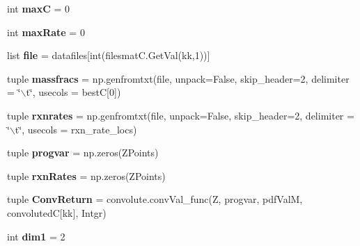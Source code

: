 \begin{DoxyCompactItemize}
\item 
\hypertarget{namespacechemtable__io_a645cd8efb888bfb4dbe872f6c047ee6d}{
int {\bfseries maxC} = 0}
\label{dc/dad/namespacechemtable__io_a645cd8efb888bfb4dbe872f6c047ee6d}

\item 
\hypertarget{namespacechemtable__io_ab840bd591060c54471e90a07a84837d1}{
int {\bfseries maxRate} = 0}
\label{dc/dad/namespacechemtable__io_ab840bd591060c54471e90a07a84837d1}

\item 
\hypertarget{namespacechemtable__io_ad1acbc31dd4224d8effffbc960625b2e}{
list {\bfseries file} = datafiles\mbox{[}int(filesmatC.GetVal(kk,1))\mbox{]}}
\label{dc/dad/namespacechemtable__io_ad1acbc31dd4224d8effffbc960625b2e}

\item 
\hypertarget{namespacechemtable__io_a1b6f65d372114ed7b5dae759fd83bc8b}{
tuple {\bfseries massfracs} = np.genfromtxt(file, unpack=False, skip\_\-header=2, delimiter = \char`\"{}$\backslash$t\char`\"{}, usecols = bestC\mbox{[}0\mbox{]})}
\label{dc/dad/namespacechemtable__io_a1b6f65d372114ed7b5dae759fd83bc8b}

\item 
\hypertarget{namespacechemtable__io_ac78dad13332ec190a05700765ceb3edc}{
tuple {\bfseries rxnrates} = np.genfromtxt(file, unpack=False, skip\_\-header=2, delimiter = \char`\"{}$\backslash$t\char`\"{}, usecols = rxn\_\-rate\_\-locs)}
\label{dc/dad/namespacechemtable__io_ac78dad13332ec190a05700765ceb3edc}

\item 
\hypertarget{namespacechemtable__io_af6294709dcccd57cf6d344de89378502}{
tuple {\bfseries progvar} = np.zeros(ZPoints)}
\label{dc/dad/namespacechemtable__io_af6294709dcccd57cf6d344de89378502}

\item 
\hypertarget{namespacechemtable__io_a86792a3eebb523ca4095a8932b9a9884}{
tuple {\bfseries rxnRates} = np.zeros(ZPoints)}
\label{dc/dad/namespacechemtable__io_a86792a3eebb523ca4095a8932b9a9884}

\item 
\hypertarget{namespacechemtable__io_a33373bd9c2c3eefc6d2cd88361c4feb6}{
tuple {\bfseries ConvReturn} = convolute.convVal\_\-func(Z, progvar, pdfValM, convolutedC\mbox{[}kk\mbox{]}, Intgr)}
\label{dc/dad/namespacechemtable__io_a33373bd9c2c3eefc6d2cd88361c4feb6}

\item 
\hypertarget{namespacechemtable__io_a7d5961afe8950c6223dea059063fefa2}{
int {\bfseries dim1} = 2}
\label{dc/dad/namespacechemtable__io_a7d5961afe8950c6223dea059063fefa2}


\end{DoxyCompactItemize}
